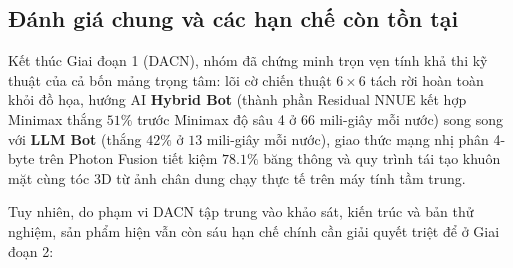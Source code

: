 \subsection{Đánh giá chung và các hạn chế còn tồn tại}
Kết thúc Giai đoạn 1 (DACN), nhóm đã chứng minh trọn vẹn tính khả thi kỹ thuật của cả bốn mảng trọng tâm: lõi cờ chiến thuật $6 \times 6$ tách rời hoàn toàn khỏi đồ họa, hướng AI \textbf{Hybrid Bot} (thành phần Residual NNUE kết hợp Minimax thắng $51\%$ trước Minimax độ sâu 4 ở $66$ mili-giây mỗi nước) song song với \textbf{LLM Bot} (thắng $42\%$ ở $13$ mili-giây mỗi nước), giao thức mạng nhị phân 4-byte trên Photon Fusion tiết kiệm $78.1\%$ băng thông và quy trình tái tạo khuôn mặt cùng tóc 3D từ ảnh chân dung chạy thực tế trên máy tính tầm trung.

Tuy nhiên, do phạm vi DACN tập trung vào khảo sát, kiến trúc và bản thử nghiệm, sản phẩm hiện vẫn còn sáu hạn chế chính cần giải quyết triệt để ở Giai đoạn 2:
